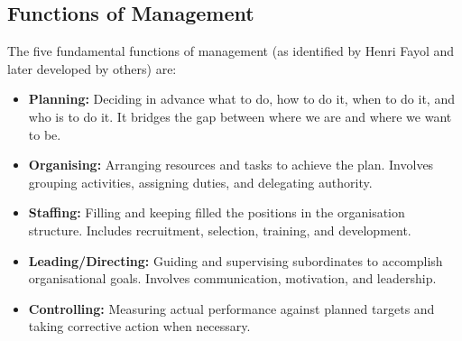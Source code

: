 \documentclass[12pt,a4paper]{article}
\begin{document}
\subsection{Functions of Management}
The five fundamental functions of management (as identified by Henri Fayol and later developed by others) are:

\begin{tcolorbox}[tikzbox, title={Five Functions of Management}]
\centering
{}
\end{tcolorbox}

\begin{itemize}[leftmargin=*, itemsep=3pt]
  \item \textbf{Planning:} Deciding in advance what to do, how to do it, when to do it, and who is to do it. It bridges the gap between where we are and where we want to be.
  \item \textbf{Organising:} Arranging resources and tasks to achieve the plan. Involves grouping activities, assigning duties, and delegating authority.
  \item \textbf{Staffing:} Filling and keeping filled the positions in the organisation structure. Includes recruitment, selection, training, and development.
  \item \textbf{Leading/Directing:} Guiding and supervising subordinates to accomplish organisational goals. Involves communication, motivation, and leadership.
  \item \textbf{Controlling:} Measuring actual performance against planned targets and taking corrective action when necessary.
\end{itemize}
\end{document}
